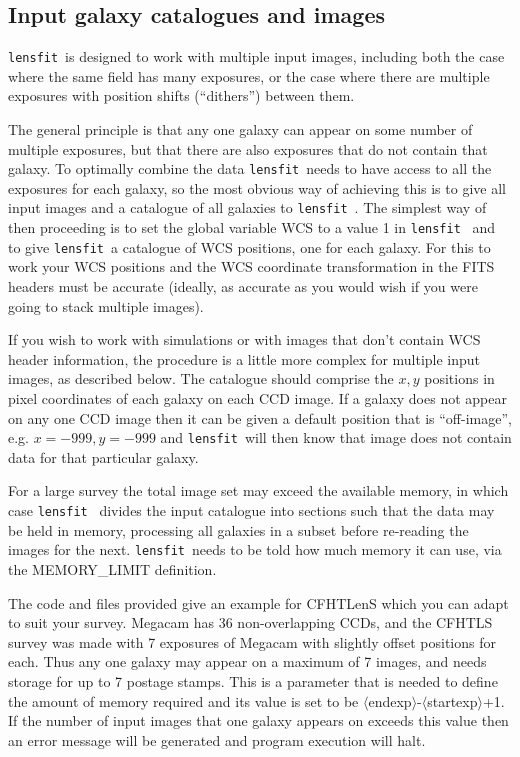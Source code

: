 \documentclass{article}
\def\lensfit{{\tt lensfit}\ }
\def\<{{$\langle$}}
\def\>{{$\rangle$}}
\begin{document}
\subsection{Input galaxy catalogues and images}

\lensfit is designed to work with multiple input images, including both the case where the same
field has many exposures, or the case where there are multiple exposures with position shifts
(``dithers'') between them.  

The general principle is that any one galaxy can appear on some number of multiple exposures,
but that there are also exposures that do not contain that galaxy.  To optimally combine the
data \lensfit needs to have access to all the exposures for each galaxy, so the most obvious
way of achieving this is to give all input images and a catalogue of all galaxies to \lensfit.
The simplest way of then proceeding is to set the global variable WCS to a value 1 in \lensfit
and to give \lensfit a catalogue of WCS positions, one for each galaxy.  For this to work your WCS
positions and the WCS coordinate transformation in the FITS headers must be accurate 
(ideally, as accurate as you would wish if you were going to stack multiple images).

If you wish to work with simulations or with images that don't contain WCS header information,
the procedure is a little more complex for multiple input images, as described below.
The catalogue should comprise the $x, y$ positions in pixel coordinates of each galaxy on
each CCD image.  If a galaxy does not appear on any one CCD image then it can be given a 
default position that is ``off-image'', e.g. $x=-999, y=-999$ and \lensfit will then know that
image does not contain data for that particular galaxy.

For a large survey the total image set may exceed the available memory, in which case \lensfit
divides the input catalogue into sections such that the data may be held in memory, processing
all galaxies in a subset before re-reading the images for the next.  \lensfit needs to be told
how much memory it can use, via the MEMORY\_LIMIT definition.

The code and files provided give an example for CFHTLenS which you can adapt to suit your survey.
Megacam has 36 non-overlapping CCDs, and the CFHTLS survey was made with 7 exposures of
Megacam with slightly offset positions for each.  Thus any one galaxy may appear on a maximum
of 7 images, and needs storage for up to 7 postage stamps.  This is a parameter that is needed
to define the amount of memory required and its value is set to be \<endexp\>-\<startexp\>+1.
If the number of input images that one galaxy appears on exceeds this value then an error
message will be generated and program execution will halt.
\end{document}
